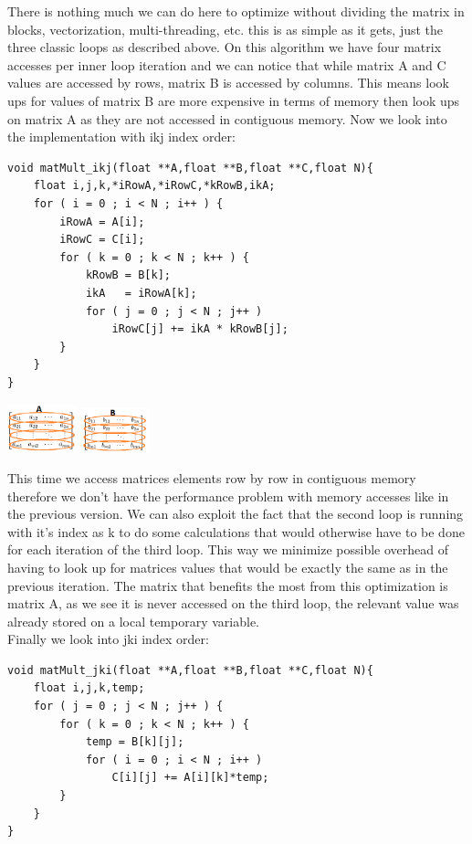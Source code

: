 \documentclass[journal]{IEEEtran}
\begin{document}
There is nothing much we can do here to optimize without dividing the matrix in blocks, vectorization, multi-threading, etc. this is as simple as it gets, just the three classic loops as described above. On this algorithm we have four matrix accesses per inner loop iteration and we can notice that while matrix A and C values are accessed by rows, matrix B is accessed by columns. This means look ups for values of matrix B are more expensive in terms of memory then look ups on matrix A as they are not accessed in contiguous memory. 
Now we look into the implementation with ikj index order:
\begin{lstlisting}
void matMult_ikj(float **A,float **B,float **C,float N){
    float i,j,k,*iRowA,*iRowC,*kRowB,ikA;
    for ( i = 0 ; i < N ; i++ ) {
        iRowA = A[i];
        iRowC = C[i];
        for ( k = 0 ; k < N ; k++ ) {
            kRowB = B[k];
            ikA   = iRowA[k];
            for ( j = 0 ; j < N ; j++ )
                iRowC[j] += ikA * kRowB[j];
        }
    }
}
\end{lstlisting}

\includegraphics[width=0.15\textwidth, left]{A_row.png}
\includegraphics[width=0.15\textwidth, right]{B_row.png}

This time we access matrices elements row by row in contiguous memory therefore we don't have the performance problem with memory accesses like in the previous version. We can also exploit the fact that the second loop is running with it's index as k to do some calculations that would otherwise have to be done for each iteration of the third loop. This way we minimize possible overhead of having to look up for matrices values that would be exactly the same as in the previous iteration. The matrix that benefits the most from this optimization is matrix A, as we see it is never accessed on the third loop, the relevant value was already stored on a local temporary variable.\\
Finally we look into jki index order:
\begin{lstlisting}
void matMult_jki(float **A,float **B,float **C,float N){
    float i,j,k,temp;
    for ( j = 0 ; j < N ; j++ ) {
        for ( k = 0 ; k < N ; k++ ) {
            temp = B[k][j];
            for ( i = 0 ; i < N ; i++ )
                C[i][j] += A[i][k]*temp;
        }
    }
}
\end{lstlisting}
\end{document}
